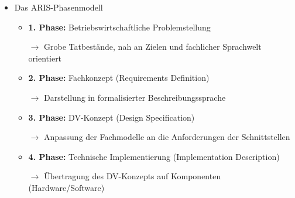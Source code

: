\documentclass[11pt,a4paper]{article}
\begin{document}
\begin{itemize}
\begin{itemize}
		\pagebreak
			
		\item Das ARIS-Phasenmodell
			\begin{itemize}
			\item \textbf{1. Phase:} Betriebswirtschaftliche Problemstellung 
			\item[$\rightarrow$]  Grobe Tatbestände, nah an Zielen und fachlicher Sprachwelt orientiert
			\item \textbf{2. Phase:} Fachkonzept (Requirements Definition)
			\item[$\rightarrow$] Darstellung in formalisierter Beschreibungssprache
			\item \textbf{3. Phase:} DV-Konzept (Design Specification)
			\item[$\rightarrow$] Anpassung der Fachmodelle an die Anforderungen der Schnittstellen
			\item \textbf{4. Phase:} Technische Implementierung (Implementation Description)
			\item[$\rightarrow$] Übertragung des DV-Konzepts auf Komponenten (Hardware/Software)
			\end{itemize}
			
		\end{itemize}

\end{itemize}
\end{document}
